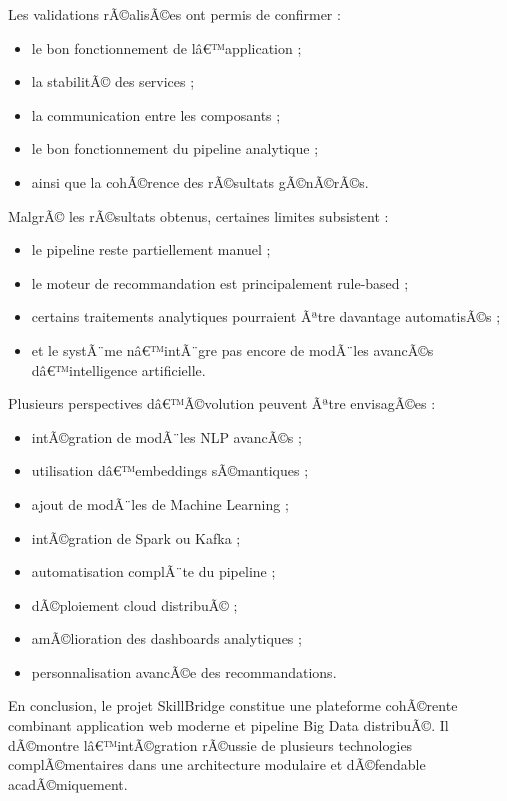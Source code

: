 ﻿\documentclass[12pt,a4paper]{report}
\begin{document}
\vspace{0.5cm}

Les validations rÃ©alisÃ©es ont permis de confirmer :
\begin{itemize}
    \item le bon fonctionnement de lâ€™application ;
    \item la stabilitÃ© des services ;
    \item la communication entre les composants ;
    \item le bon fonctionnement du pipeline analytique ;
    \item ainsi que la cohÃ©rence des rÃ©sultats gÃ©nÃ©rÃ©s.
\end{itemize}

MalgrÃ© les rÃ©sultats obtenus, certaines limites subsistent :
\begin{itemize}
    \item le pipeline reste partiellement manuel ;
    \item le moteur de recommandation est principalement rule-based ;
    \item certains traitements analytiques pourraient Ãªtre davantage automatisÃ©s ;
    \item et le systÃ¨me nâ€™intÃ¨gre pas encore de modÃ¨les avancÃ©s dâ€™intelligence artificielle.
\end{itemize}

\vspace{0.5cm}

Plusieurs perspectives dâ€™Ã©volution peuvent Ãªtre envisagÃ©es :
\begin{itemize}
    \item intÃ©gration de modÃ¨les NLP avancÃ©s ;
    \item utilisation dâ€™embeddings sÃ©mantiques ;
    \item ajout de modÃ¨les de Machine Learning ;
    \item intÃ©gration de Spark ou Kafka ;
    \item automatisation complÃ¨te du pipeline ;
    \item dÃ©ploiement cloud distribuÃ© ;
    \item amÃ©lioration des dashboards analytiques ;
    \item personnalisation avancÃ©e des recommandations.
\end{itemize}

\vspace{0.5cm}

En conclusion, le projet SkillBridge constitue une plateforme cohÃ©rente combinant application web moderne et pipeline Big Data distribuÃ©. Il dÃ©montre lâ€™intÃ©gration rÃ©ussie de plusieurs technologies complÃ©mentaires dans une architecture modulaire et dÃ©fendable acadÃ©miquement.
\end{document}
